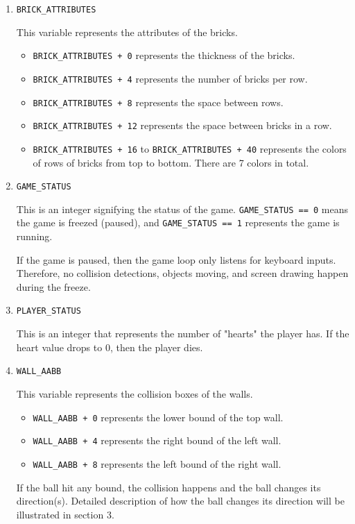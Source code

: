 \documentclass{article}
\newcommand{\code}[1]{\texttt{#1}}
\begin{document}
\begin{enumerate}
\item \code{BRICK\_ATTRIBUTES}

This variable represents the attributes of the bricks. 
\begin{itemize}
    \item \code{BRICK\_ATTRIBUTES + 0} represents the thickness of the bricks.
    \item \code{BRICK\_ATTRIBUTES + 4} represents the number of bricks per row.
    \item \code{BRICK\_ATTRIBUTES + 8} represents the space between rows.
    \item \code{BRICK\_ATTRIBUTES + 12} represents the space between bricks in a row.
    \item \code{BRICK\_ATTRIBUTES + 16} to \code{BRICK\_ATTRIBUTES + 40} represents the colors of rows of bricks from top to bottom. There are 7 colors in total.  
\end{itemize}

\item \code{GAME\_STATUS}

This is an integer signifying the status of the game. \code{GAME\_STATUS == 0} means the game is freezed (paused), and \code{GAME\_STATUS == 1} represents the game is running.

If the game is paused, then the game loop only listens for keyboard inputs. Therefore, no collision detections, objects moving, and screen drawing happen during the freeze.

\item \code{PLAYER\_STATUS}

This is an integer that represents the number of "hearts" the player has. If the heart value drops to 0, then the player dies. 

\item \code{WALL\_AABB}

This variable represents the collision boxes of the walls.

\begin{itemize}
    \item \code{WALL\_AABB + 0} represents the lower bound of the top wall.
    \item \code{WALL\_AABB + 4} represents the right bound of the left wall.
    \item \code{WALL\_AABB + 8} represents the left bound of the right wall.
\end{itemize}

If the ball hit any bound, the collision happens and the ball changes its direction(s). Detailed description of how the ball changes its direction will be illustrated in section 3.


\end{enumerate}
\end{document}
